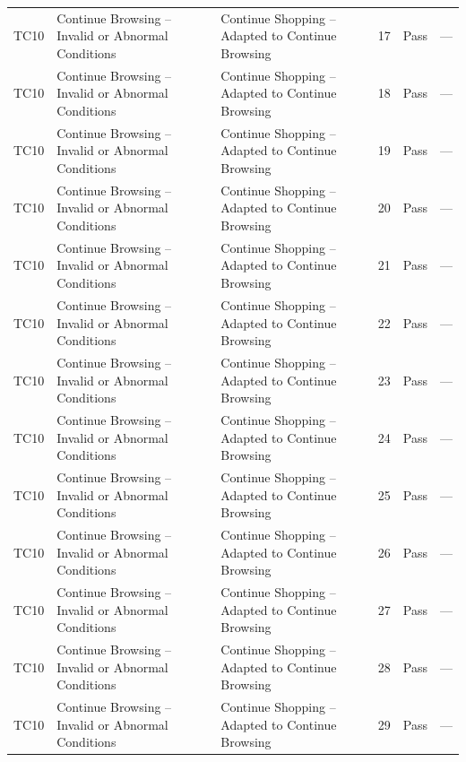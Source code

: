 {\begin{longtable}{@{}p{1.2cm} p{4.2cm} p{4.4cm} p{0.8cm} p{0.9cm} p{1.6cm}@{}}
  TC10 & Continue Browsing -- Invalid or Abnormal Conditions & Continue Shopping -- Adapted to Continue Browsing & 17 & Pass & --- \\
  TC10 & Continue Browsing -- Invalid or Abnormal Conditions & Continue Shopping -- Adapted to Continue Browsing & 18 & Pass & --- \\
  TC10 & Continue Browsing -- Invalid or Abnormal Conditions & Continue Shopping -- Adapted to Continue Browsing & 19 & Pass & --- \\
  TC10 & Continue Browsing -- Invalid or Abnormal Conditions & Continue Shopping -- Adapted to Continue Browsing & 20 & Pass & --- \\
  TC10 & Continue Browsing -- Invalid or Abnormal Conditions & Continue Shopping -- Adapted to Continue Browsing & 21 & Pass & --- \\
  TC10 & Continue Browsing -- Invalid or Abnormal Conditions & Continue Shopping -- Adapted to Continue Browsing & 22 & Pass & --- \\
  TC10 & Continue Browsing -- Invalid or Abnormal Conditions & Continue Shopping -- Adapted to Continue Browsing & 23 & Pass & --- \\
  TC10 & Continue Browsing -- Invalid or Abnormal Conditions & Continue Shopping -- Adapted to Continue Browsing & 24 & Pass & --- \\
  TC10 & Continue Browsing -- Invalid or Abnormal Conditions & Continue Shopping -- Adapted to Continue Browsing & 25 & Pass & --- \\
  TC10 & Continue Browsing -- Invalid or Abnormal Conditions & Continue Shopping -- Adapted to Continue Browsing & 26 & Pass & --- \\
  TC10 & Continue Browsing -- Invalid or Abnormal Conditions & Continue Shopping -- Adapted to Continue Browsing & 27 & Pass & --- \\
  TC10 & Continue Browsing -- Invalid or Abnormal Conditions & Continue Shopping -- Adapted to Continue Browsing & 28 & Pass & --- \\
  TC10 & Continue Browsing -- Invalid or Abnormal Conditions & Continue Shopping -- Adapted to Continue Browsing & 29 & Pass & --- \\
\end{longtable}
}
